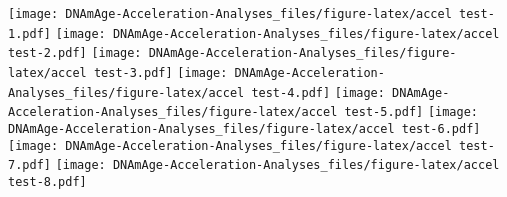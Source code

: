 \documentclass[]{article}
\newenvironment{Shaded}{\begin{snugshade}}{\end{snugshade}}
\newcommand{\KeywordTok}[1]{\textcolor[rgb]{0.13,0.29,0.53}{\textbf{#1}}}
\newcommand{\DataTypeTok}[1]{\textcolor[rgb]{0.13,0.29,0.53}{#1}}
\newcommand{\DecValTok}[1]{\textcolor[rgb]{0.00,0.00,0.81}{#1}}
\newcommand{\StringTok}[1]{\textcolor[rgb]{0.31,0.60,0.02}{#1}}
\newcommand{\ControlFlowTok}[1]{\textcolor[rgb]{0.13,0.29,0.53}{\textbf{#1}}}
\newcommand{\OperatorTok}[1]{\textcolor[rgb]{0.81,0.36,0.00}{\textbf{#1}}}
\newcommand{\NormalTok}[1]{#1}
\begin{document}
\begin{Shaded}
\end{Shaded}

\texttt{[image: DNAmAge-Acceleration-Analyses\_files/figure-latex/accel test-1.pdf]}
\texttt{[image: DNAmAge-Acceleration-Analyses\_files/figure-latex/accel test-2.pdf]}
\texttt{[image: DNAmAge-Acceleration-Analyses\_files/figure-latex/accel test-3.pdf]}
\texttt{[image: DNAmAge-Acceleration-Analyses\_files/figure-latex/accel test-4.pdf]}
\texttt{[image: DNAmAge-Acceleration-Analyses\_files/figure-latex/accel test-5.pdf]}
\texttt{[image: DNAmAge-Acceleration-Analyses\_files/figure-latex/accel test-6.pdf]}
\texttt{[image: DNAmAge-Acceleration-Analyses\_files/figure-latex/accel test-7.pdf]}
\texttt{[image: DNAmAge-Acceleration-Analyses\_files/figure-latex/accel test-8.pdf]}
\end{document}
